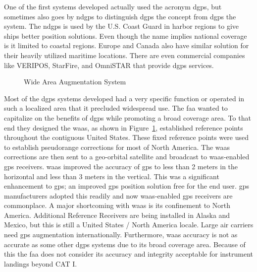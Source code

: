 One of the first systems developed actually used the acronym \ac{dgps}, but sometimes also goes by \ac{ndgps} to distinguish \ac{dgps} the concept from \ac{dgps} the system.  The \ac{ndgps} is used by the U.S. Coast Guard in harbor regions to give ships better position solutions.  Even though the name implies national coverage is it limited to coastal regions. Europe and Canada also have similar solution for their heavily utilized maritime locations. There are even commercial companies like VERIPOS, StarFire, and OmniSTAR that provide \ac{dgps} services.

\begin{figure}
	\centering
	\caption{Wide Area Augmentation System\citep[]{FAA_WAAS}}
	\label{fig:FAA_WAAS}
\end{figure}

Most of the \ac{dgps} systems developed had a very specific function or operated in such a localized area that it precluded widespread use. The \ac{faa} wanted to capitalize on the benefits of \ac{dgps} while promoting a broad coverage area. To that end they designed the \ac{waas}, as shown in Figure~\ref{fig:FAA_WAAS}, established reference points throughout the contiguous United States. These fixed reference points were used to establish pseudorange corrections for most of North America.  The \ac{waas} corrections are then sent to a geo-orbital satellite and broadcast to \ac{waas}-enabled \ac{gps} receivers.  \ac{waas} improved the accuracy of \ac{gps} to less than 2 meters in the horizontal and less than 3 meters in the vertical. This was a significant enhancement to \ac{gps}; an improved \ac{gps} position solution free for the end user.  \ac{gps} manufacturers adopted this readily and now \ac{waas}-enabled \ac{gps} receivers are commonplace. A major shortcoming with \ac{waas} is its confinement to North America.  Additional Reference Receivers are being installed in Alaska and Mexico, but this is still a United States / North America locale. Large air carriers need \ac{gps} augmentation internationally. Furthermore, \ac{waas} accuracy is not as accurate as some other \ac{dgps} systems due to its broad coverage area.  Because of this the \ac{faa} does not consider its accuracy and integrity acceptable for instrument landings beyond CAT I.

